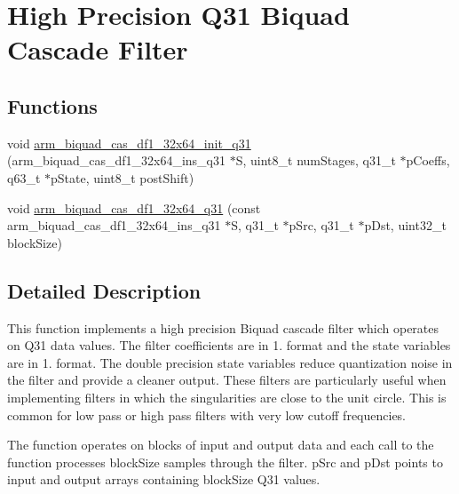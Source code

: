 \hypertarget{group__BiquadCascadeDF1__32x64}{}\section{High Precision Q31 Biquad Cascade Filter}
\label{group__BiquadCascadeDF1__32x64}
\subsection*{Functions}
\begin{DoxyCompactItemize}
\item 
void \hyperlink{group__BiquadCascadeDF1__32x64_ga44900cecb8083afcaabf905ffcd656bb}{arm\+\_\+biquad\+\_\+cas\+\_\+df1\+\_\+32x64\+\_\+init\+\_\+q31} (arm\+\_\+biquad\+\_\+cas\+\_\+df1\+\_\+32x64\+\_\+ins\+\_\+q31 $\ast$S, uint8\+\_\+t num\+Stages, q31\+\_\+t $\ast$p\+Coeffs, q63\+\_\+t $\ast$p\+State, uint8\+\_\+t post\+Shift)
\item 
void \hyperlink{group__BiquadCascadeDF1__32x64_ga953a83e69685de6575cff37feb358a93}{arm\+\_\+biquad\+\_\+cas\+\_\+df1\+\_\+32x64\+\_\+q31} (const arm\+\_\+biquad\+\_\+cas\+\_\+df1\+\_\+32x64\+\_\+ins\+\_\+q31 $\ast$S, q31\+\_\+t $\ast$p\+Src, q31\+\_\+t $\ast$p\+Dst, uint32\+\_\+t block\+Size)
\end{DoxyCompactItemize}


\subsection{Detailed Description}
This function implements a high precision Biquad cascade filter which operates on Q31 data values. The filter coefficients are in 1. format and the state variables are in 1. format. The double precision state variables reduce quantization noise in the filter and provide a cleaner output. These filters are particularly useful when implementing filters in which the singularities are close to the unit circle. This is common for low pass or high pass filters with very low cutoff frequencies.

The function operates on blocks of input and output data and each call to the function processes {\ttfamily block\+Size} samples through the filter. {\ttfamily p\+Src} and {\ttfamily p\+Dst} points to input and output arrays containing {\ttfamily block\+Size} Q31 values.

